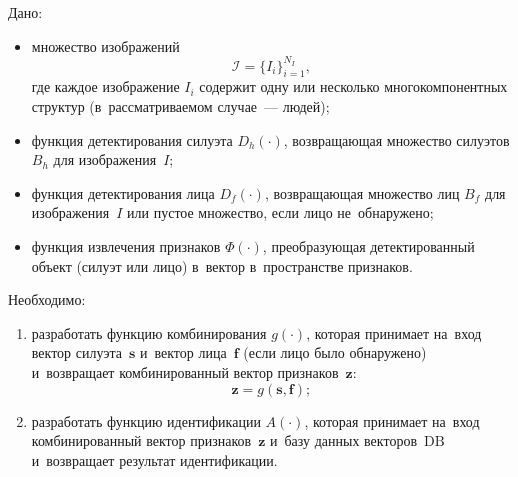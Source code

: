 Дано:
\begin{itemize}
    \item множество изображений
    \begin{equation}\label{eq:ch1/images}
        \mathcal{I}=\{I_i\}_{i=1}^{N_I},
    \end{equation}
    где каждое изображение $I_i$ содержит одну или несколько многокомпонентных структур (в~рассматриваемом случае~--- людей);

    \item функция детектирования силуэта $D_h(\cdot)$, возвращающая
    множество силуэтов $B_h$ для изображения~$I$;

    \item функция детектирования лица $D_f(\cdot)$, возвращающая
    множество лиц $B_f$ для изображения~$I$ или пустое множество, если
    лицо не~обнаружено;

    \item функция извлечения признаков $\Phi(\cdot)$, преобразующая
    детектированный объект (силуэт или лицо) в~вектор в~пространстве
    признаков.
\end{itemize}

Необходимо:
\begin{enumerate}
    \item разработать функцию комбинирования $g(\cdot)$, которая
    принимает на~вход вектор силуэта~$\mathbf{s}$ и~вектор
    лица~$\mathbf{f}$ (если лицо было обнаружено) и~возвращает
    комбинированный вектор признаков~$\mathbf{z}$:
    \begin{equation}\label{eq:ch1/combine}
        \mathbf{z}=g(\mathbf{s},\mathbf{f});
    \end{equation}

    \item разработать функцию идентификации $A(\cdot)$, которая
    принимает на~вход комбинированный вектор признаков~$\mathbf{z}$
    и~базу данных векторов~$\mathrm{DB}$ и~возвращает результат
    идентификации.
\end{enumerate}

